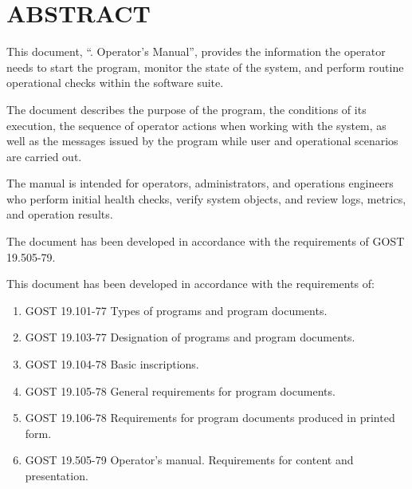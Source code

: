 \documentclass[12pt,a4paper]{extarticle}
\begin{document}
\sloppy





\section*{ABSTRACT}

This document, \enquote{\projectname. Operator's Manual}, provides the information the operator needs to start the program, monitor the state of the system, and perform routine operational checks within the software suite.

The document describes the purpose of the program, the conditions of its execution, the sequence of operator actions when working with the system, as well as the messages issued by the program while user and operational scenarios are carried out.

The manual is intended for operators, administrators, and operations engineers who perform initial health checks, verify system objects, and review logs, metrics, and operation results.

The document has been developed in accordance with the requirements of GOST 19.505-79\cite{gost19505}.

\clearpage

\noindent
This document has been developed in accordance with the requirements of:

\begin{enumerate}[label=\arabic*), leftmargin=1.25cm]
\item GOST 19.101-77 Types of programs and program documents\cite{gost19101}.
\item GOST 19.103-77 Designation of programs and program documents\cite{gost19103}.
\item GOST 19.104-78 Basic inscriptions\cite{gost19104}.
\item GOST 19.105-78 General requirements for program documents\cite{gost19105}.
\item GOST 19.106-78 Requirements for program documents produced in printed form\cite{gost19106}.
\item GOST 19.505-79 Operator's manual. Requirements for content and presentation\cite{gost19505}.
\end{enumerate}
\end{document}
